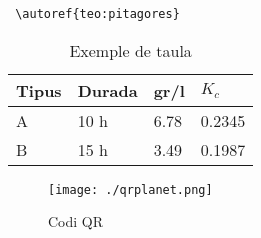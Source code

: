 \documentclass[fontsize=12pt,%
               DIV=calc,%
               captions=tableheading,%
               numbers=noenddot,%
               parskip=full,%
               ]{scrartcl}
\begin{document}
\verb+ \autoref{teo:pitagores}+

\lipsum[2-3]

 \begin{table}[ht]
  \centering
  \begin{tabular}{llll}
    \toprule
    Tipus & Durada & gr/l & $K_c$ \\
    \midrule
    A & 10 h & 6.78 & 0.2345 \\
    B & 15 h & 3.49 & 0.1987 \\
    \bottomrule
  \end{tabular}
  \caption{Exemple de taula}
  \label{tau:durada}
\end{table}

\lipsum[2-4]

\begin{figure}[ht]
 \centering
 \texttt{[image: ./qrplanet.png]}
 \label{fig:qrcode}
 \caption{Codi QR}
\end{figure}
\end{document}

